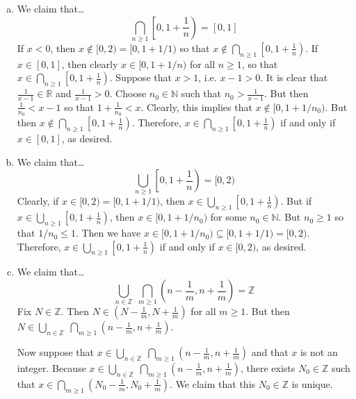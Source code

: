 \documentclass[11pt,letterpaper]{article}
\begin{document}
\sol
\begin{enumerate}[(a)]
\item We claim that\dots
	\[
	\bigcap_{n \geq 1} \left[0, 1 + \frac{1}{n} \right)= [0, 1]
	\]
If $x < 0$, then $x \notin [0, 2)= [0, 1 + 1/1)$ so that $x \notin \bigcap_{n \geq 1} \left[0, 1 + \frac{1}{n} \right)$. If $x \in [0, 1]$, then clearly $x \in [0, 1 + 1/n)$ for all $n \geq 1$, so that $x \in \bigcap_{n \geq 1} \left[0, 1 + \frac{1}{n} \right)$. Suppose that $x > 1$, i.e. $x - 1 > 0$. It is clear that $\frac{1}{x - 1} \in \mathbb{R}$ and $\frac{1}{x - 1} > 0$. Choose $n_0 \in \mathbb{N}$ such that $n_0 > \frac{1}{x - 1}$. But then $\frac{1}{n_0} < x - 1$ so that $1 + \frac{1}{n_0} < x$. Clearly, this implies that $x \notin [0, 1 + 1/n_0)$. But then $x \notin \bigcap_{n \geq 1} \left[0, 1 + \frac{1}{n} \right)$. Therefore, $x \in \bigcap_{n \geq 1} \left[0, 1 + \frac{1}{n} \right)$ if and only if $x \in [0, 1]$, as desired. 

\item We claim that\dots
	\[
	\bigcup_{n \geq 1} \left[0, 1 + \frac{1}{n} \right)= [0, 2)
	\]
Clearly, if $x \in [0, 2)= [0, 1+1/1)$, then $x \in \bigcup_{n \geq 1} \left[0, 1 + \frac{1}{n} \right)$. But if $x \in \bigcup_{n \geq 1} \left[0, 1 + \frac{1}{n} \right)$, then $x \in [0, 1 + 1/n_0)$ for some $n_0 \in \mathbb{N}$. But $n_0 \geq 1$ so that $1/n_0 \leq 1$. Then we have $x \in [0, 1 + 1/n_0) \subseteq [0, 1 + 1/1)= [0, 2)$. Therefore, $x \in \bigcup_{n \geq 1} \left[0, 1 + \frac{1}{n} \right)$ if and only if $x \in [0, 2)$, as desired. 

\item We claim that\dots
	\[
	\bigcup_{n \in \mathbb{Z}}\; \bigcap_{m \geq 1} \left( n - \frac{1}{m}, n + \frac{1}{m} \right)= \mathbb{Z}
	\]
Fix $N \in \mathbb{Z}$. Then $N \in (N - \frac{1}{m}, N + \frac{1}{m})$ for all $m \geq 1$. But then $N \in \bigcup_{n \in \mathbb{Z}}\; \bigcap_{m \geq 1} \left( n - \frac{1}{m}, n + \frac{1}{m} \right)$. 

Now suppose that $x \in \bigcup_{n \in \mathbb{Z}}\; \bigcap_{m \geq 1} \left( n - \frac{1}{m}, n + \frac{1}{m} \right)$ and that $x$ is not an integer. Because $x \in \bigcup_{n \in \mathbb{Z}}\; \bigcap_{m \geq 1} \left( n - \frac{1}{m}, n + \frac{1}{m} \right)$, there exists $N_0 \in \mathbb{Z}$ such that $x \in \bigcap_{m \geq 1} \left( N_0 - \frac{1}{m}, N_0 + \frac{1}{m} \right)$. We claim that this $N_0 \in \mathbb{Z}$ is unique. 


\end{enumerate}
\end{document}
